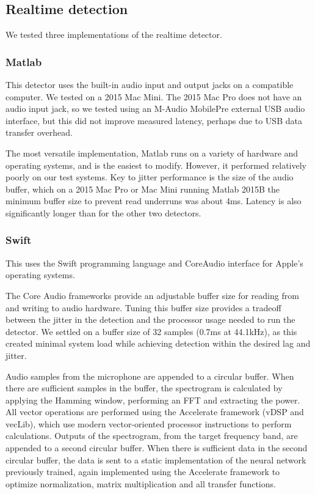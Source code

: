 \documentclass{article}
\begin{document}
\subsection{Realtime detection}

We tested three implementations of the realtime detector.

\subsubsection{Matlab}

This detector uses the built-in audio input and output jacks on a compatible computer.  We tested on a 2015 Mac Mini.  The 2015 Mac Pro does not have an audio input jack, so we tested using an M-Audio MobilePre external USB audio interface, but this did not improve measured latency, perhaps due to USB data transfer overhead.

The most versatile implementation, Matlab runs on a variety of hardware and operating systems, and is the easiest to modify.  However, it performed relatively poorly on our test systems.  Key to jitter performance is the size of the audio buffer, which on a 2015 Mac Pro or Mac Mini running Matlab 2015B the minimum buffer size to prevent read underruns was about 4ms.  Latency is also significantly longer than for the other two detectors.

\subsubsection{Swift}

This uses the Swift programming language and CoreAudio interface for Apple's operating systems.

The Core Audio frameworks provide an adjustable buffer size for 
reading from and writing to audio hardware. Tuning this buffer size
provides a tradeoff between the jitter in the detection and the 
processor usage needed to run the detector. We settled on a buffer 
size of 32 samples (0.7ms at 44.1kHz), as this created minimal system
load while achieving detection within the desired lag and jitter.

Audio samples from the microphone are appended to a circular buffer. 
When there are sufficient samples in the buffer, the spectrogram is
calculated by applying the Hamming window, performing an FFT and 
extracting the power. All vector operations are performed using the
Accelerate framework (vDSP and vecLib), which use modern vector-oriented processor instructions to perform calculations. Outputs
of the spectrogram, from the target frequency band, are appended 
to a second circular buffer. When there is sufficient data in the
second circular buffer, the data is sent to a static implementation
of the neural network previously trained, again implemented using
the Accelerate framework to optimize normalization, matrix 
multiplication and all transfer functions.
\end{document}
